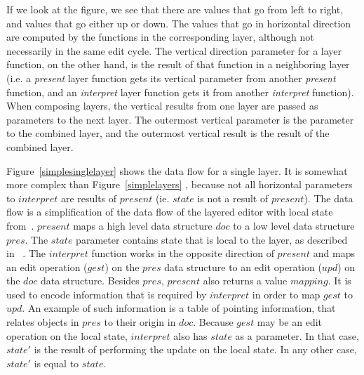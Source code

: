 If we look at the figure, we see that there are values that go from left to right, and values that go either up or down. The values that go in horizontal direction are computed by the functions in the corresponding layer, although not necessarily in the same edit cycle. The vertical direction parameter for a layer function, on the other hand, is the result of that function in a neighboring layer (i.e. a {\em present} layer function gets its vertical parameter from another {\em present} function, and an {\em interpret} layer function gets it from another {\em interpret} function). When composing layers, the vertical results from one layer are passed as parameters to the next layer. The outermost vertical parameter is the parameter to the combined layer, and the outermost vertical result is the result of the combined layer. 


Figure~\ref{simplesinglelayer} shows the data flow for a single layer. It is somewhat more complex than Figure~\ref{simplelayers} , because not all horizontal parameters to $interpret$ are results of $present$  (ie. $state$ is not a result of $present$). The data flow is a simplification of the data flow of the layered editor with local state from~\cite{architecture}. $present$ maps a high level data structure $doc$ to a low level data structure $pres$. The $state$ parameter contains state that is local to the layer, as described in~\cite{architecture} . The $interpret$ function works in the opposite direction of $present$ and maps an edit operation ($gest$) on the $pres$ data structure to an edit operation ($upd$) on the $doc$ data structure. Besides $pres$, $present$ also returns a value $mapping$. It is used to encode information that is required by $interpret$ in order to map $gest$ to $upd$. An example of such information is a table of pointing information, that relates objects in $pres$ to their origin in $doc$. Because $gest$ may be an edit operation on the local state, $interpret$ also has $state$ as a parameter. In that case, $state'$ is the result of performing the update on the local state. In any other case, $state'$ is equal to $state$. 

